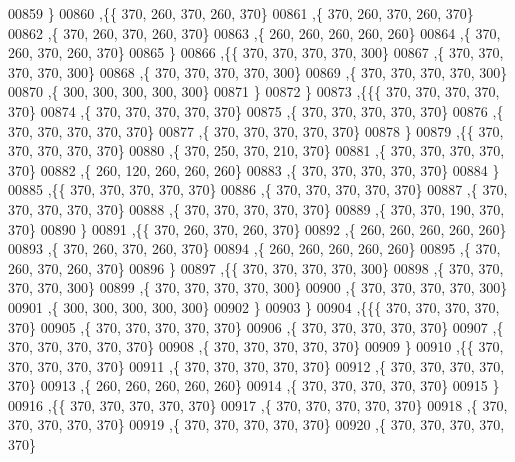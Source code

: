 \begin{DoxyCode}
00859    \}
00860   ,\{\{   370,   260,   370,   260,   370\}
00861    ,\{   370,   260,   370,   260,   370\}
00862    ,\{   370,   260,   370,   260,   370\}
00863    ,\{   260,   260,   260,   260,   260\}
00864    ,\{   370,   260,   370,   260,   370\}
00865    \}
00866   ,\{\{   370,   370,   370,   370,   300\}
00867    ,\{   370,   370,   370,   370,   300\}
00868    ,\{   370,   370,   370,   370,   300\}
00869    ,\{   370,   370,   370,   370,   300\}
00870    ,\{   300,   300,   300,   300,   300\}
00871    \}
00872   \}
00873  ,\{\{\{   370,   370,   370,   370,   370\}
00874    ,\{   370,   370,   370,   370,   370\}
00875    ,\{   370,   370,   370,   370,   370\}
00876    ,\{   370,   370,   370,   370,   370\}
00877    ,\{   370,   370,   370,   370,   370\}
00878    \}
00879   ,\{\{   370,   370,   370,   370,   370\}
00880    ,\{   370,   250,   370,   210,   370\}
00881    ,\{   370,   370,   370,   370,   370\}
00882    ,\{   260,   120,   260,   260,   260\}
00883    ,\{   370,   370,   370,   370,   370\}
00884    \}
00885   ,\{\{   370,   370,   370,   370,   370\}
00886    ,\{   370,   370,   370,   370,   370\}
00887    ,\{   370,   370,   370,   370,   370\}
00888    ,\{   370,   370,   370,   370,   370\}
00889    ,\{   370,   370,   190,   370,   370\}
00890    \}
00891   ,\{\{   370,   260,   370,   260,   370\}
00892    ,\{   260,   260,   260,   260,   260\}
00893    ,\{   370,   260,   370,   260,   370\}
00894    ,\{   260,   260,   260,   260,   260\}
00895    ,\{   370,   260,   370,   260,   370\}
00896    \}
00897   ,\{\{   370,   370,   370,   370,   300\}
00898    ,\{   370,   370,   370,   370,   300\}
00899    ,\{   370,   370,   370,   370,   300\}
00900    ,\{   370,   370,   370,   370,   300\}
00901    ,\{   300,   300,   300,   300,   300\}
00902    \}
00903   \}
00904  ,\{\{\{   370,   370,   370,   370,   370\}
00905    ,\{   370,   370,   370,   370,   370\}
00906    ,\{   370,   370,   370,   370,   370\}
00907    ,\{   370,   370,   370,   370,   370\}
00908    ,\{   370,   370,   370,   370,   370\}
00909    \}
00910   ,\{\{   370,   370,   370,   370,   370\}
00911    ,\{   370,   370,   370,   370,   370\}
00912    ,\{   370,   370,   370,   370,   370\}
00913    ,\{   260,   260,   260,   260,   260\}
00914    ,\{   370,   370,   370,   370,   370\}
00915    \}
00916   ,\{\{   370,   370,   370,   370,   370\}
00917    ,\{   370,   370,   370,   370,   370\}
00918    ,\{   370,   370,   370,   370,   370\}
00919    ,\{   370,   370,   370,   370,   370\}
00920    ,\{   370,   370,   370,   370,   370\}

\end{DoxyCode}
